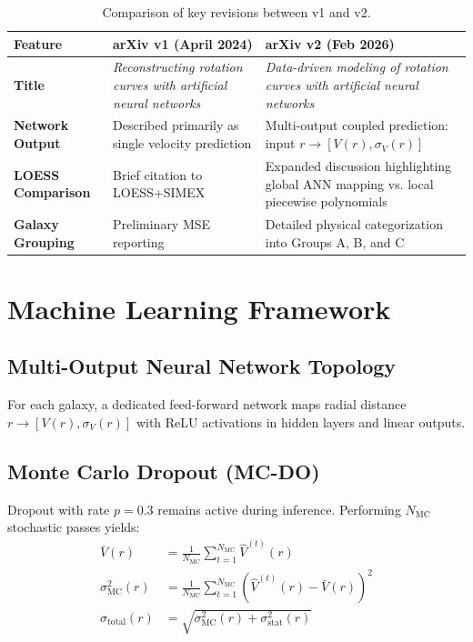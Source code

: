 \documentclass[11pt,a4paper]{article}
\begin{document}
\begin{table}[h!]
\centering
\small
\begin{tabular}{p{2.8cm} p{5.5cm} p{5.5cm}}
\toprule
\textbf{Feature} & \textbf{arXiv v1 (April 2024)} & \textbf{arXiv v2 (Feb 2026)} \\
\midrule
\textbf{Title} & \textit{Reconstructing rotation curves with artificial neural networks} & \textit{Data-driven modeling of rotation curves with artificial neural networks} \\
\midrule
\textbf{Network Output} & Described primarily as single velocity prediction & Multi-output coupled prediction: input $r \to [V(r), \sigma_V(r)]$ \\
\midrule
\textbf{LOESS Comparison} & Brief citation to LOESS+SIMEX & Expanded discussion highlighting global ANN mapping vs. local piecewise polynomials \\
\midrule
\textbf{Galaxy Grouping} & Preliminary MSE reporting & Detailed physical categorization into Groups A, B, and C \\
\bottomrule
\end{tabular}
\caption{Comparison of key revisions between v1 and v2.}
\end{table}

\section{Machine Learning Framework}

\subsection{Multi-Output Neural Network Topology}
For each galaxy, a dedicated feed-forward network maps radial distance $r \to [V(r), \sigma_V(r)]$ with $\text{ReLU}$ activations in hidden layers and linear outputs.

\subsection{Monte Carlo Dropout (MC-DO)}
Dropout with rate $p=0.3$ remains active during inference. Performing $N_{\text{MC}}$ stochastic passes yields:
\begin{align}
\bar{V}(r) &= \frac{1}{N_{\text{MC}}} \sum_{t=1}^{N_{\text{MC}}} \hat{V}^{(t)}(r) \\
\sigma_{\text{MC}}^2(r) &= \frac{1}{N_{\text{MC}}} \sum_{t=1}^{N_{\text{MC}}} \left( \hat{V}^{(t)}(r) - \bar{V}(r) \right)^2 \\
\sigma_{\text{total}}(r) &= \sqrt{\sigma_{\text{MC}}^2(r) + \sigma_{\text{stat}}^2(r)}
\end{align}
\end{document}
